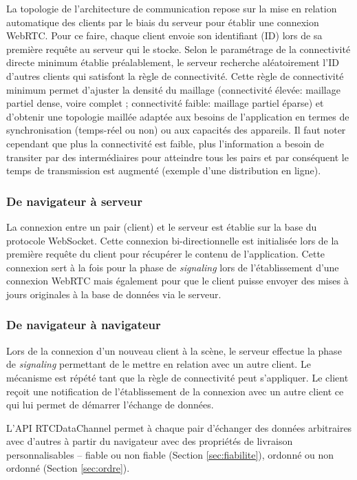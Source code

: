 La topologie de l'architecture de communication repose sur la mise en relation 
automatique des clients par le biais du serveur pour établir une connexion 
\gls{WebRTC}. Pour ce faire, chaque client envoie son identifiant (ID) lors de sa 
première requête au serveur qui le stocke. Selon le paramétrage de la connectivité 
directe minimum établie préalablement, le serveur recherche aléatoirement l'ID 
d'autres clients qui satisfont la règle de connectivité. Cette règle de connectivité 
minimum permet d'ajuster la densité du maillage (connectivité élevée: maillage 
partiel dense, voire complet ; connectivité faible: maillage partiel éparse) et 
d'obtenir une topologie maillée adaptée aux besoins de l'application en termes de 
synchronisation (temps-réel ou non) ou aux capacités des appareils. Il faut noter 
cependant que plus la connectivité est faible, plus l'information a besoin de transiter par des intermédiaires pour atteindre tous les pairs et par conséquent le temps de 
transmission est augmenté (exemple d'une distribution en ligne). 

\subsubsection{De navigateur à serveur}
La connexion entre un pair (client) et le serveur est établie sur la base du protocole 
\gls{WebSocket}. Cette connexion bi-directionnelle est initialisée lors de la 
première requête du client pour récupérer le contenu de l'application. Cette 
connexion sert à la fois pour la phase de \textit{signaling} lors de l'établissement 
d'une connexion WebRTC mais également pour que le client puisse envoyer des 
mises à jours originales à la base de données via le serveur.

\subsubsection{De navigateur à navigateur}
Lors de la connexion d'un nouveau client à la scène, le serveur effectue la phase 
de \textit{signaling} permettant de le mettre en relation avec un autre client. Le 
mécanisme est répété tant que la règle de connectivité peut s'appliquer. Le client 
reçoit une notification de l'établissement de la connexion avec un autre client ce 
qui lui permet de démarrer l'échange de données.

L'API RTCDataChannel permet à chaque pair d'échanger des données arbitraires 
avec d'autres à partir du navigateur avec des propriétés de livraison 
personnalisables -- fiable ou non fiable (Section \ref{sec:fiabilite}), ordonné ou non 
ordonné (Section \ref{sec:ordre}). 

